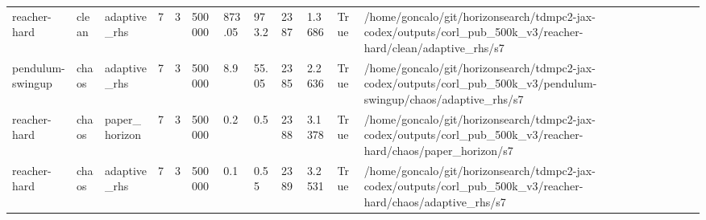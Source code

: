 \begin{tabular}{llllllllllll}
reacher-hard & clean & adaptive\_rhs & 7 & 3 & 500000 & 873.05 & 973.2 & 2387 & 1.3686 & True & /home/goncalo/git/horizonsearch/tdmpc2-jax-codex/outputs/corl\_pub\_500k\_v3/reacher-hard/clean/adaptive\_rhs/s7 \\
pendulum-swingup & chaos & adaptive\_rhs & 7 & 3 & 500000 & 8.9 & 55.05 & 2385 & 2.2636 & True & /home/goncalo/git/horizonsearch/tdmpc2-jax-codex/outputs/corl\_pub\_500k\_v3/pendulum-swingup/chaos/adaptive\_rhs/s7 \\
reacher-hard & chaos & paper\_horizon & 7 & 3 & 500000 & 0.2 & 0.5 & 2388 & 3.1378 & True & /home/goncalo/git/horizonsearch/tdmpc2-jax-codex/outputs/corl\_pub\_500k\_v3/reacher-hard/chaos/paper\_horizon/s7 \\
reacher-hard & chaos & adaptive\_rhs & 7 & 3 & 500000 & 0.1 & 0.55 & 2389 & 3.2531 & True & /home/goncalo/git/horizonsearch/tdmpc2-jax-codex/outputs/corl\_pub\_500k\_v3/reacher-hard/chaos/adaptive\_rhs/s7 \\
\bottomrule
\end{tabular}

